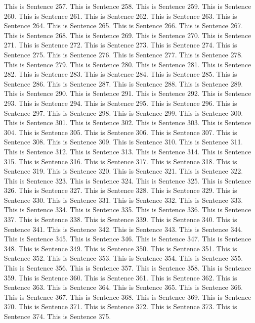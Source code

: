 \documentclass{article}
\begin{document}
This is Sentence 257.
This is Sentence 258.
This is Sentence 259.
This is Sentence 260.
This is Sentence 261.
This is Sentence 262.
This is Sentence 263.
This is Sentence 264.
This is Sentence 265.
This is Sentence 266.
This is Sentence 267.
This is Sentence 268.
This is Sentence 269.
This is Sentence 270.
This is Sentence 271.
This is Sentence 272.
This is Sentence 273.
This is Sentence 274.
This is Sentence 275.
This is Sentence 276.
This is Sentence 277.
This is Sentence 278.
This is Sentence 279.
This is Sentence 280.
This is Sentence 281.
This is Sentence 282.
This is Sentence 283.
This is Sentence 284.
This is Sentence 285.
This is Sentence 286.
This is Sentence 287.
This is Sentence 288.
This is Sentence 289.
This is Sentence 290.
This is Sentence 291.
This is Sentence 292.
This is Sentence 293.
This is Sentence 294.
This is Sentence 295.
This is Sentence 296.
This is Sentence 297.
This is Sentence 298.
This is Sentence 299.
This is Sentence 300.
This is Sentence 301.
This is Sentence 302.
This is Sentence 303.
This is Sentence 304.
This is Sentence 305.
This is Sentence 306.
This is Sentence 307.
This is Sentence 308.
This is Sentence 309.
This is Sentence 310.
This is Sentence 311.
This is Sentence 312.
This is Sentence 313.
This is Sentence 314.
This is Sentence 315.
This is Sentence 316.
This is Sentence 317.
This is Sentence 318.
This is Sentence 319.
This is Sentence 320.
This is Sentence 321.
This is Sentence 322.
This is Sentence 323.
This is Sentence 324.
This is Sentence 325.
This is Sentence 326.
This is Sentence 327.
This is Sentence 328.
This is Sentence 329.
This is Sentence 330.
This is Sentence 331.
This is Sentence 332.
This is Sentence 333.
This is Sentence 334.
This is Sentence 335.
This is Sentence 336.
This is Sentence 337.
This is Sentence 338.
This is Sentence 339.
This is Sentence 340.
This is Sentence 341.
This is Sentence 342.
This is Sentence 343.
This is Sentence 344.
This is Sentence 345.
This is Sentence 346.
This is Sentence 347.
This is Sentence 348.
This is Sentence 349.
This is Sentence 350.
This is Sentence 351.
This is Sentence 352.
This is Sentence 353.
This is Sentence 354.
This is Sentence 355.
This is Sentence 356.
This is Sentence 357.
This is Sentence 358.
This is Sentence 359.
This is Sentence 360.
This is Sentence 361.
This is Sentence 362.
This is Sentence 363.
This is Sentence 364.
This is Sentence 365.
This is Sentence 366.
This is Sentence 367.
This is Sentence 368.
This is Sentence 369.
This is Sentence 370.
This is Sentence 371.
This is Sentence 372.
This is Sentence 373.
This is Sentence 374.
This is Sentence 375.
\end{document}

